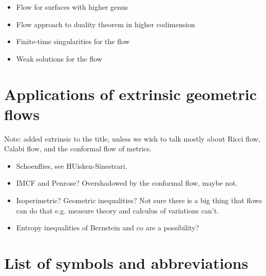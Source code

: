 \documentclass{amsart}
\theoremstyle{definition}
\begin{document}
\begin{itemize}
\item Flow for surfaces with higher genus
\item Flow approach to duality theorem in higher codimension
\item Finite-time singularities for the flow
\item Weak solutions for the flow
\end{itemize}
 
\section{Applications of extrinsic geometric flows}

Note: added extrinsic to the title, unless we wish to talk mostly about Ricci flow, Calabi flow, and the conformal flow of metrics.

\begin{itemize}
\item Schoenflies, see HUisken-Sinestrari.
\item IMCF and Penrose? Overshadowed by the conformal flow, maybe not.
\item Isoperimetric? Geometric inequalities? Not sure there is a big thing that flows can do that e.g. measure theory and calculus of variations can't.
\item Entropy inequalities of Bernstein and co are a possibility?
\end{itemize}

\section{List of symbols and abbreviations}
\end{document}
